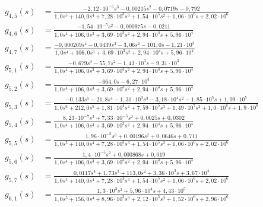 \begin{landscape}
\begin{align}
    g_{4,5}(s) &= \frac{- 2{,}12 \cdot 10^{-5} s^{3} - 0{,}00215 s^{2} - 0{,}0719 s - 0{,}792}{1{,}0 s^{5} + 140{,}0 s^{4} + 7{,}28 \cdot 10^{3} s^{3} + 1{,}54 \cdot 10^{5} s^{2} + 1{,}06 \cdot 10^{6} s + 2{,}02 \cdot 10^{6}} \\
    g_{4,6}(s) &= \frac{- 1{,}54 \cdot 10^{-5} s^{2} - 0{,}000975 s - 0{,}0211}{1{,}0 s^{4} + 106{,}0 s^{3} + 3{,}69 \cdot 10^{3} s^{2} + 2{,}94 \cdot 10^{4} s + 5{,}96 \cdot 10^{4}} \\
    g_{4,7}(s) &= \frac{- 0{,}000269 s^{4} - 0{,}0439 s^{3} - 3{,}06 s^{2} - 101{,}0 s - 1{,}21 \cdot 10^{3}}{1{,}0 s^{4} + 106{,}0 s^{3} + 3{,}69 \cdot 10^{3} s^{2} + 2{,}94 \cdot 10^{4} s + 5{,}96 \cdot 10^{4}} \\
    g_{5,1}(s) &= \frac{- 0{,}679 s^{3} - 55{,}7 s^{2} - 1{,}43 \cdot 10^{3} s - 9{,}31 \cdot 10^{3}}{1{,}0 s^{4} + 106{,}0 s^{3} + 3{,}69 \cdot 10^{3} s^{2} + 2{,}94 \cdot 10^{4} s + 5{,}96 \cdot 10^{4}} \\
    g_{5,2}(s) &= \frac{- 664{,}0 s - 6{,}27 \cdot 10^{3}}{1{,}0 s^{4} + 106{,}0 s^{3} + 3{,}69 \cdot 10^{3} s^{2} + 2{,}94 \cdot 10^{4} s + 5{,}96 \cdot 10^{4}} \\
    g_{5,3}(s) &= \frac{- 0{,}133 s^{5} - 21{,}8 s^{4} - 1{,}31 \cdot 10^{3} s^{3} - 3{,}18 \cdot 10^{4} s^{2} - 1{,}85 \cdot 10^{5} s + 1{,}09 \cdot 10^{5}}{1{,}0 s^{6} + 212{,}0 s^{5} + 1{,}81 \cdot 10^{4} s^{4} + 7{,}59 \cdot 10^{5} s^{3} + 1{,}49 \cdot 10^{7} s^{2} + 1{,}0 \cdot 10^{8} s + 1{,}9 \cdot 10^{8}} \\
    g_{5,4}(s) &= \frac{8{,}23 \cdot 10^{-7} s^{3} + 7{,}33 \cdot 10^{-5} s^{2} + 0{,}0025 s + 0{,}0302}{1{,}0 s^{4} + 106{,}0 s^{3} + 3{,}69 \cdot 10^{3} s^{2} + 2{,}94 \cdot 10^{4} s + 5{,}96 \cdot 10^{4}} \\
    g_{5,5}(s) &= \frac{1{,}96 \cdot 10^{-5} s^{3} + 0{,}00196 s^{2} + 0{,}0646 s + 0{,}711}{1{,}0 s^{5} + 140{,}0 s^{4} + 7{,}28 \cdot 10^{3} s^{3} + 1{,}54 \cdot 10^{5} s^{2} + 1{,}06 \cdot 10^{6} s + 2{,}02 \cdot 10^{6}} \\
    g_{5,6}(s) &= \frac{1{,}4 \cdot 10^{-5} s^{2} + 0{,}000868 s + 0{,}019}{1{,}0 s^{4} + 106{,}0 s^{3} + 3{,}69 \cdot 10^{3} s^{2} + 2{,}94 \cdot 10^{4} s + 5{,}96 \cdot 10^{4}} \\
    g_{5,7}(s) &= \frac{0{,}0117 s^{4} + 1{,}73 s^{3} + 113{,}0 s^{2} + 3{,}36 \cdot 10^{3} s + 3{,}67 \cdot 10^{4}}{1{,}0 s^{5} + 140{,}0 s^{4} + 7{,}28 \cdot 10^{3} s^{3} + 1{,}54 \cdot 10^{5} s^{2} + 1{,}06 \cdot 10^{6} s + 2{,}02 \cdot 10^{6}} \\
    g_{6,1}(s) &= \frac{1{,}3 \cdot 10^{3} s^{2} + 5{,}96 \cdot 10^{4} s + 4{,}43 \cdot 10^{5}}{1{,}0 s^{5} + 156{,}0 s^{4} + 8{,}96 \cdot 10^{3} s^{3} + 2{,}12 \cdot 10^{5} s^{2} + 1{,}52 \cdot 10^{6} s + 2{,}96 \cdot 10^{6}} \\

\end{align}
\end{landscape}
